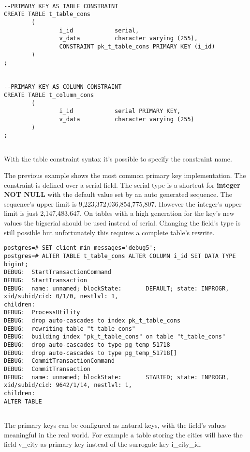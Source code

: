 \begin{lstlisting}[style=pgsql]

--PRIMARY KEY AS TABLE CONSTRAINT
CREATE TABLE t_table_cons
        (
                i_id            serial,
                v_data          character varying (255),
                CONSTRAINT pk_t_table_cons PRIMARY KEY (i_id)
        )
;


--PRIMARY KEY AS COLUMN CONSTRAINT
CREATE TABLE t_column_cons
        (
                i_id            serial PRIMARY KEY,
                v_data          character varying (255)
        )
;
 

\end{lstlisting}

With the table constraint syntax it's possible to specify the constraint name.\newline

The previous example shows the most common primary key implementation. The constraint is defined over a
serial field. The serial type is a shortcut for \textbf{integer NOT NULL} with the default
value set by an auto generated sequence. The sequence's upper limit is 9,223,372,036,854,775,807.
However the integer's upper limit is just 2,147,483,647. On tables with a high generation for the key's
new values the bigserial should be used instead of serial. Changing the field's
type is still possible but unfortunately this requires a complete table's rewrite.\newline 


\begin{lstlisting}[style=pgsql]
postgres=# SET client_min_messages='debug5';
postgres=# ALTER TABLE t_table_cons ALTER COLUMN i_id SET DATA TYPE  bigint; 
DEBUG:  StartTransactionCommand
DEBUG:  StartTransaction
DEBUG:  name: unnamed; blockState:       DEFAULT; state: INPROGR, xid/subid/cid: 0/1/0, nestlvl: 1,
children: 
DEBUG:  ProcessUtility
DEBUG:  drop auto-cascades to index pk_t_table_cons
DEBUG:  rewriting table "t_table_cons"
DEBUG:  building index "pk_t_table_cons" on table "t_table_cons"
DEBUG:  drop auto-cascades to type pg_temp_51718
DEBUG:  drop auto-cascades to type pg_temp_51718[]
DEBUG:  CommitTransactionCommand
DEBUG:  CommitTransaction
DEBUG:  name: unnamed; blockState:       STARTED; state: INPROGR, xid/subid/cid: 9642/1/14, nestlvl: 1,
children: 
ALTER TABLE


\end{lstlisting}

The primary keys can be configured as natural keys, with the field's values meaningful in the real
world. For example a table storing the cities will have the field v\_city as primary key instead of
the surrogate key i\_city\_id.                                                                          
        

